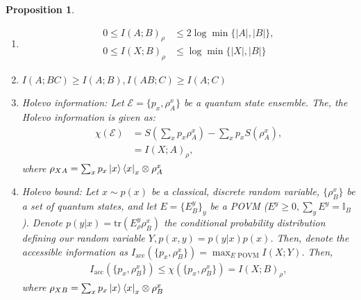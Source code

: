 \documentclass[notoc]{tufte-book}
\newtheorem{proposition}[theorem]{Proposition}
\begin{document}
\begin{tcolorbox}[colframe=white,breakable, colback=black!5, arc=0pt, outer arc=0pt]
\begin{proposition}\label{prop:properties-mutual-information}
\begin{enumerate}
    \item \begin{align}
        0 \leq I(A;B)_{\rho} &\leq 2\log{\min{\{|A|,|B|\}}},\\
        0\leq I(X;B)_{\rho} &\leq \log{\min{\{|X|,|B|\}}}
    \end{align}
    \item $I(A;BC) \geq I(A;B), I(AB;C)\geq I(A;C)$
    \item Holevo information: Let $\mathcal{E}=\{p_x, \rho_A^x\}$ be a quantum state ensemble. The, the Holevo information  is given as:
    \begin{align}
        \chi (\mathcal{E})&= S(\sum_x p_x \rho_A^x) - \sum_x p_x S(\rho_A^x), \\
        &= I(X;A)_{\rho},
    \end{align}
    where $\rho_{XA} =\sum_x p_x \ket{x}\bra{x}_x \otimes \rho_A^x$
    \item Holevo bound: Let $x\sim p(x)$ be a classical, discrete random variable, $\{\rho_B^x\}$ be a set of quantum states, and let $E=\{E_B^y\}_y$ be a POVM ($E^y \geq 0, \sum_y E^y = \mathbb{I}_B$). Denote $p(y|x)=\text{tr}(E^y_\rho \rho_B^x)$ the conditional probability distribution defining our random variable $Y, p(x,y)=p(y|x)p(x)$. Then, denote the accessible information as $I_{\text{acc}}(\{p_x,\rho_B^x\}) = \max_{E \text{ POVM}} I(X;Y)$. Then,
    \begin{align}
      I_{\text{acc}}(\{p_x,\rho_B^x\}) \leq \chi(\{p_x, \rho_B^x\}) =I(X;B)_{\rho},
    \end{align}
    where $\rho_{XB}=\sum_x p_x \ket{x}\bra{x}_x \otimes \rho_B^x$
\end{enumerate}

\end{proposition}
\end{tcolorbox}
\end{document}
